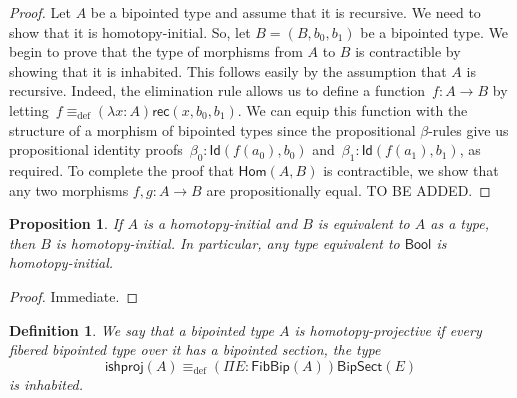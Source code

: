 \documentclass[reqno,10pt,a4paper,oneside]{amsart}
\numberwithin{equation}{section}
\theoremstyle{mythm}
\newtheorem{proposition}[theorem]{Proposition}
\theoremstyle{mydef}
\newtheorem{definition}[theorem]{Definition}
\theoremstyle{myrmk}
\newcommand{\ie}{\text{i.e.\ }}
\newcommand{\deq}{\equiv}
\newcommand{\defeq}{\deq_{\mathrm{def}}}
\newcommand{\co}{\colon}
\newcommand{\Id}{\mathsf{Id}}
\newcommand{\Bool}{\mathsf{Bool}}
\newcommand{\rec}{\mathsf{rec}}
\newcommand{\Hom}{\mathsf{Hom}}
\newcommand{\FibBip}{\mathsf{FibBip}}
\newcommand{\BipSect}{\mathsf{BipSect}}
\newcommand{\ishproj}{\mathsf{ishproj}}
\begin{document}
\begin{proof} Let $A$ be a bipointed type
and assume that it is recursive. We need to show that it is homotopy-initial. So, let $B = (B, b_0, b_1)$ be a bipointed type. We begin to prove
that the type of morphisms from $A$ to $B$ is contractible by showing that it is inhabited. This follows easily by the assumption that $A$
is recursive. Indeed, the elimination rule allows us to define a function~$f \co A \to B$ by letting~$f \defeq (\lambda x \co A) \rec(x, b_0, b_1)$. We can
equip this function with the structure of a morphism of bipointed types since the propositional $\beta$-rules give us propositional identity 
proofs~$\beta_0 \co \Id(f (a_0), b_0)$ and~$\beta_1 \co \Id (f(a_1), b_1)$, as required. To complete the proof that $\Hom(A,B)$ is contractible,
we show that any two morphisms $f, g \co A \to B$ are propositionally equal.  TO BE ADDED.
\end{proof} 


\begin{proposition} \label{thm:hinitequiv}
 If $A$ is a homotopy-initial and $B$ is equivalent to $A$ as a type, then $B$ is homotopy-initial.
In particular, any type equivalent to $\Bool$ is homotopy-initial.
\end{proposition} 

\begin{proof} Immediate.
\end{proof}

\begin{definition} We say that a bipointed type $A$ is \emph{homotopy-projective} if every fibered bipointed type over it has a bipointed section, \ie the type
\[ 
\ishproj(A) \defeq (\Pi E : \FibBip(A))  \BipSect(E)
\]  
is inhabited.
\end{definition} 
\end{document}
